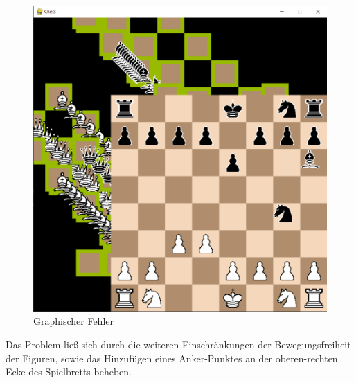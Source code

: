 \documentclass[a4paper, 10pt]{scrartcl}
\begin{document}
\begin{figure}[h]
        \centering
        \includegraphics[scale=0.3]{assets/tf_have_I_done.png}
        \caption{Graphischer Fehler}
\end{figure}
Das Problem ließ sich durch die weiteren Einschränkungen
der Bewegungsfreiheit der Figuren, sowie das Hinzufügen eines
Anker-Punktes an der oberen-rechten Ecke des Spielbretts beheben. 
\end{document}
